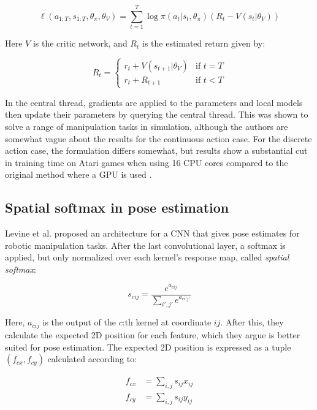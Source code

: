 \begin{equation}
    \ell(a_{1:T}, s_{1:T}, \theta_\pi, \theta_V) = \sum_{t=1}^T \log \pi (a_t|s_t, \theta_\pi) (R_t - V(s_t|\theta_V))
\end{equation}

Here $V$ is the critic network, and $R_t$ is the estimated return given by:

\begin{equation}
    R_t =
    \begin{cases}
        r_t + V(s_{t+1}|\theta_V) & \text{if } t = T\\
        r_t + R_{t+1} & \text{if } t < T
    \end{cases}
\end{equation}

In the central thread, gradients are applied to the parameters and local models
then update their parameters by querying the central thread. This was shown to
solve a range of manipulation tasks in simulation, although the authors are
somewhat vague about the results for the continuous action case. For the
discrete action case, the formulation differs somewhat, but results show a
substantial cut in training time on Atari games when using 16 CPU cores
compared to the original method where a GPU is used \cite{mnih2013playing}.

\subsection{Spatial softmax in pose estimation}

Levine et al. \cite{levine2016end} proposed an architecture for a CNN that
gives pose estimates for robotic manipulation tasks. After the last
convolutional layer, a softmax is applied, but only normalized over each
kernel's response map, called \textit{spatial softmax}:

\begin{equation}
    s_{cij} = \frac{e^{a_{cij}}}{\sum_{i',j'} e^{a_{ci'j'}}}
\end{equation}

Here, $a_{cij}$ is the output of the $c$:th kernel at coordinate $ij$. After
this, they calculate the expected 2D position for each feature, which they
argue is better suited for pose estimation. The expected 2D position is
expressed as a tuple $(f_{cx}, f_{cy})$ calculated according to:

\begin{align}
    f_{cx} &= \sum_{i,j} s_{ij} x_{ij} \\
    f_{cy} &= \sum_{i,j} s_{ij} y_{ij}
\end{align}

